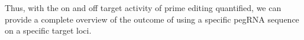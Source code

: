 Thus, with the on and off target activity of prime editing quantified, we can provide a complete overview of the outcome of using a specific pegRNA sequence on a specific target loci. 
